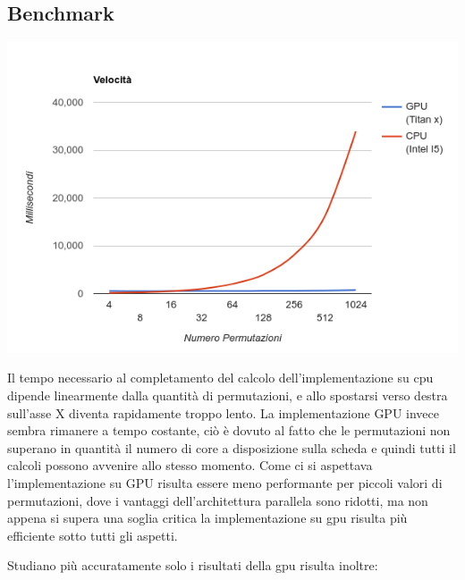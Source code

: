 \subsection{Benchmark}
\begin{center}
\includegraphics[width=\linewidth]{confronto}
\end{center}
Il tempo necessario al completamento del calcolo dell'implementazione su cpu dipende linearmente dalla quantità di permutazioni, e allo spostarsi verso destra sull'asse X diventa rapidamente troppo lento. La implementazione GPU invece sembra rimanere a tempo costante, ciò è dovuto al fatto che le permutazioni non superano in quantità il numero di core a disposizione sulla scheda e quindi tutti il calcoli possono avvenire allo stesso momento. 
Come ci si aspettava l'implementazione su GPU risulta essere meno performante per piccoli valori di permutazioni, dove i vantaggi dell'architettura parallela sono ridotti, ma non appena si supera una soglia critica la implementazione su gpu risulta più efficiente sotto tutti gli aspetti.

Studiano più accuratamente solo i risultati della gpu risulta inoltre:

